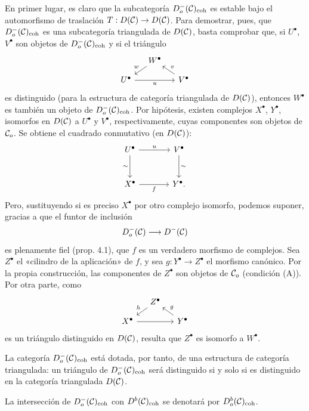En primer lugar, es claro que la subcategoría $D_o^-(\mathcal C)_{\mathrm{coh}}$ es estable bajo el automorfismo de traslación $T:D(\mathcal C)\to D(\mathcal C)$. Para demostrar, pues, que $D_o^-(\mathcal C)_{\mathrm{coh}}$ es una subcategoría triangulada de $D(\mathcal C)$, basta comprobar que, si $U^\bullet$, $V^\bullet$ son objetos de $D_o^-(\mathcal C)_{\mathrm{coh}}$ y si el triángulo
\[
\begin{tikzcd}[column sep=small,row sep=small]
& W^\bullet \arrow[dl,"w"']\\
U^\bullet \arrow[rr,"u"']&& V^\bullet \arrow[ul,"v"']
\end{tikzcd}
\]
es distinguido (para la estructura de categoría triangulada de $D(\mathcal C)$), entonces $W^\bullet$ es también un objeto de $D_o^-(\mathcal C)_{\mathrm{coh}}$. Por hipótesis, existen complejos $X^\bullet$, $Y^\bullet$, isomorfos en $D(\mathcal C)$ a $U^\bullet$ y $V^\bullet$, respectivamente, cuyas componentes son objetos de $\mathcal C_o$. Se obtiene el cuadrado conmutativo (en $D(\mathcal C)$):
\[
\begin{tikzcd}[column sep=large,row sep=large]
U^\bullet \arrow[r,"u"] \arrow[d,"\sim"']&V^\bullet \arrow[d,"\sim"]\\
X^\bullet \arrow[r,"f"']&Y^\bullet .
\end{tikzcd}
\]
Pero, sustituyendo si es preciso $X^\bullet$ por otro complejo isomorfo, podemos suponer, gracias a que el funtor de inclusión
\[
D_o^-(\mathcal C)\longrightarrow D^-(\mathcal C)
\]
es plenamente fiel (prop. 4.1), que $f$ es un verdadero morfismo de complejos. Sea $Z^\bullet$ el «cilindro de la aplicación» de $f$, y sea $g:Y^\bullet\to Z^\bullet$ el morfismo canónico. Por la propia construcción, las componentes de $Z^\bullet$ son objetos de $\mathcal C_o$ (condición (A)). Por otra parte, como
\[
\begin{tikzcd}[column sep=small,row sep=small]
&Z^\bullet \arrow[dl,"h"']\\
X^\bullet \arrow[rr]&&Y^\bullet \arrow[ul,"g"']
\end{tikzcd}
\]
es un triángulo distinguido en $D(\mathcal C)$, resulta que $Z^\bullet$ es isomorfo a $W^\bullet$.

La categoría $D_o^-(\mathcal C)_{\mathrm{coh}}$ está dotada, por tanto, de una estructura de categoría triangulada: un triángulo de $D_o^-(\mathcal C)_{\mathrm{coh}}$ será distinguido si y solo si es distinguido en la categoría triangulada $D(\mathcal C)$.

La intersección de $D_o^-(\mathcal C)_{\mathrm{coh}}$ con $D^b(\mathcal C)_{\mathrm{coh}}$ se denotará por $D_o^b(\mathcal C)_{\mathrm{coh}}$.
